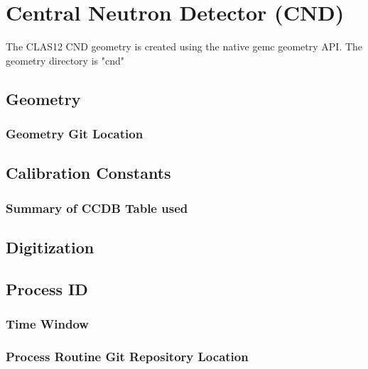\section{Central Neutron Detector (CND)}


The CLAS12 CND geometry is created using the native gemc geometry API.
The geometry directory is "cnd"

\subsection{Geometry}

\subsubsection{Geometry Git Location}

\subsection{Calibration Constants}

\subsubsection{Summary of CCDB Table used}

\subsection{Digitization}

\subsection{Process ID}

\subsubsection{Time Window}

\subsubsection{Process Routine Git Repository Location}


